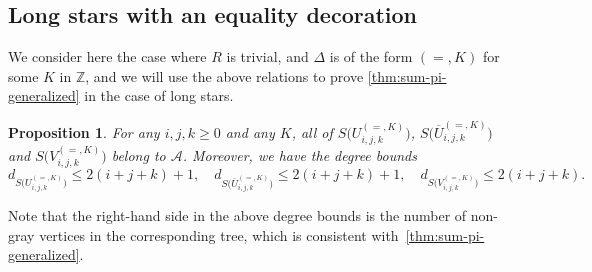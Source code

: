 \documentclass[12pt]{amsart}
\theoremstyle{plain}
\newtheorem{proposition}[lemma]{Proposition}
\theoremstyle{remark}
\def\Z{\mathbb{Z}}
\def\cA{\mathcal{A}}
\begin{document}
\subsection{Long stars with an equality decoration}
We consider here the case where $R$ is trivial,
and $\Delta$ is of the form $(=,K)$ for some $K$ in $\Z$,
and we will use the above relations to prove \cref{thm:sum-pi-generalized}
in the case of long stars.
\begin{proposition}\label{prop:UV}
For any $i,j,k \ge 0$ and any $K$,
all of $S\big(U^{(=,K)}_{i,j,k}\big)$, $S\big(\overline{U}^{(=,K)}_{i,j,k}\big)$ and $S\big(V^{(=,K)}_{i,j,k}\big)$
belong to $\cA$. Moreover, we have the degree bounds
\[d_{S\big(U^{(=,K)}_{i,j,k}\big)} \le 2(i+j+k)+1, \quad d_{S\big(\overline{U}^{(=,K)}_{i,j,k}\big)} \le 2(i+j+k)+1,
\quad d_{S\big(V^{(=,K)}_{i,j,k}\big)} \le 2(i+j+k).\]
\end{proposition}
Note that the right-hand side in the above degree bounds is the number of non-gray vertices
in the corresponding tree, which is consistent with~\cref{thm:sum-pi-generalized}.
\end{document}
